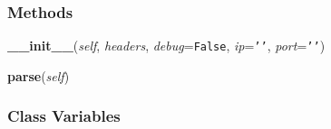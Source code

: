 
  \subsubsection{Methods}

    \label{Headers:ClientHeaders:__init__}

    \vspace{0.5ex}

\hspace{.8\funcindent}\begin{boxedminipage}{\funcwidth}

    \raggedright \textbf{\_\_init\_\_}(\textit{self}, \textit{headers}, \textit{debug}={\tt False}, \textit{ip}={\tt \texttt{'}\texttt{}\texttt{'}}, \textit{port}={\tt \texttt{'}\texttt{}\texttt{'}})

\setlength{\parskip}{2ex}
\setlength{\parskip}{1ex}
    \end{boxedminipage}

    \label{Headers:ClientHeaders:parse}

    \vspace{0.5ex}

\hspace{.8\funcindent}\begin{boxedminipage}{\funcwidth}

    \raggedright \textbf{parse}(\textit{self})

\setlength{\parskip}{2ex}
\setlength{\parskip}{1ex}
    \end{boxedminipage}



  \subsubsection{Class Variables}

